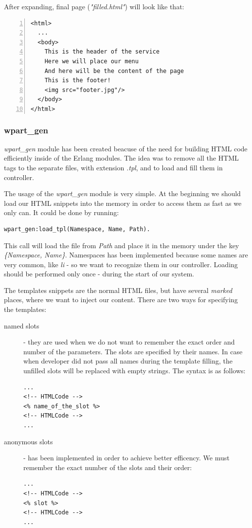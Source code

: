 After expanding, final page ({\it "filled.html"}) will look like that:
\begin{Verbatim}[numbers=left]
<html>
  ...
  <body>
    This is the header of the service
    Here we will place our menu
    And here will be the content of the page
    This is the footer!
    <img src="footer.jpg"/>
  </body>
</html>
\end{Verbatim}

\subsubsection{wpart\_gen} {\it wpart\_gen} module has been created beacuse of the need for building HTML code efficiently inside of the Erlang modules.
The idea was to remove all the HTML tags to the separate files, with extension {\it .tpl}, and to load and fill them in controller.

The usage of the {\it wpart\_gen} module is very simple. 
At the beginning we should load our HTML snippets into the memory in order to access them as fast as we only can.
It could be done by running:
\begin{verbatim}
wpart_gen:load_tpl(Namespace, Name, Path).
\end{verbatim}
This call will load the file from {\it Path} and place it in the memory under the key {\it \{Namespace, Name\}}. 
Namespaces has been implemented because some names are very common, like {\it li} - so we want to recognize them in our controller.
Loading should be performed only once - during the start of our system.

The templates snippets are the normal HTML files, but have several {\it marked} places, where we want to inject our content. 
There are two ways for specifying the templates:
\begin{description}
\item[named slots]- they are used when we do not want to remember the exact order and number of the parameters. 
The slots are specified by their names. 
In case when developer did not pass all names during the template filling, the unfilled slots will be replaced with empty strings.
The syntax is as follows:
\begin{verbatim}
...
<!-- HTMLCode -->
<% name_of_the_slot %>
<!-- HTMLCode -->
...
\end{verbatim}

\item[anonymous slots]- has been implemented in order to achieve better efficency.
We must remember the exact number of the slots and their order:
\begin{verbatim}
...
<!-- HTMLCode -->
<% slot %>
<!-- HTMLCode -->
...
\end{verbatim}
\end{description}

